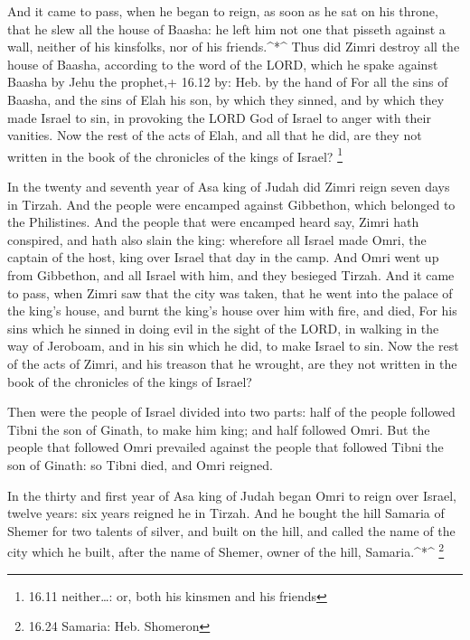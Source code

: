  And it came to pass, when he began to reign, as soon as he
sat on his throne, that he slew all the house of Baasha: he left him not
one that pisseth against a wall, neither of his kinsfolks, nor of his
friends.\^{}*\^{}  Thus did Zimri destroy all the house of
Baasha, according to the word of the LORD, which he spake against Baasha
by Jehu the prophet,+ 16.12 by: Heb. by the hand of  For
all the sins of Baasha, and the sins of Elah his son, by which they
sinned, and by which they made Israel to sin, in provoking the LORD God
of Israel to anger with their vanities.  Now the rest of
the acts of Elah, and all that he did, are they not written in the book
of the chronicles of the kings of Israel? \footnote{16.11 neither\ldots:
  or, both his kinsmen and his friends}

 In the twenty and seventh year of Asa king of Judah did
Zimri reign seven days in Tirzah. And the people were encamped against
Gibbethon, which belonged to the Philistines.  And the
people that were encamped heard say, Zimri hath conspired, and hath also
slain the king: wherefore all Israel made Omri, the captain of the host,
king over Israel that day in the camp.  And Omri went up
from Gibbethon, and all Israel with him, and they besieged Tirzah.
 And it came to pass, when Zimri saw that the city was
taken, that he went into the palace of the king's house, and burnt the
king's house over him with fire, and died,  For his sins
which he sinned in doing evil in the sight of the LORD, in walking in
the way of Jeroboam, and in his sin which he did, to make Israel to sin.
 Now the rest of the acts of Zimri, and his treason that he
wrought, are they not written in the book of the chronicles of the kings
of Israel?

 Then were the people of Israel divided into two parts:
half of the people followed Tibni the son of Ginath, to make him king;
and half followed Omri.  But the people that followed Omri
prevailed against the people that followed Tibni the son of Ginath: so
Tibni died, and Omri reigned.

 In the thirty and first year of Asa king of Judah began
Omri to reign over Israel, twelve years: six years reigned he in Tirzah.
 And he bought the hill Samaria of Shemer for two talents
of silver, and built on the hill, and called the name of the city which
he built, after the name of Shemer, owner of the hill, Samaria.\^{}*\^{}
\footnote{16.24 Samaria: Heb. Shomeron}

